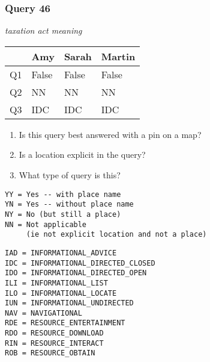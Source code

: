\begin{frame}[fragile]
\frametitle{Query 46}
\vspace{1em}

\emph{taxation act meaning}

\vfill

\begin{table}
  \centering
  \begin{tabular}{ l l l l }
    & \textbf{Amy} & \textbf{Sarah} & \textbf{Martin}\\
    \toprule
    Q1 & False & False & False\\
Q2 & NN & NN & NN\\
Q3 & IDC & IDC & IDC\\
    \bottomrule
  \end{tabular}
\end{table}

\vfill

\tiny{

\begin{enumerate}
\item Is this query best answered with a pin on a map?
\item Is a location explicit in the query?
\item What type of query is this?
\end{enumerate}

\vfill

\begin{multicols}{2}
\begin{verbatim}
YY = Yes -- with place name
YN = Yes -- without place name
NY = No (but still a place)
NN = Not applicable 
     (ie not explicit location and not a place)
\end{verbatim}

\columnbreak
\begin{verbatim}
IAD = INFORMATIONAL_ADVICE
IDC = INFORMATIONAL_DIRECTED_CLOSED
IDO = INFORMATIONAL_DIRECTED_OPEN
ILI = INFORMATIONAL_LIST
ILO = INFORMATIONAL_LOCATE
IUN = INFORMATIONAL_UNDIRECTED
NAV = NAVIGATIONAL
RDE = RESOURCE_ENTERTAINMENT
RDO = RESOURCE_DOWNLOAD
RIN = RESOURCE_INTERACT
ROB = RESOURCE_OBTAIN
\end{verbatim}
\end{multicols}
}

\end{frame}


